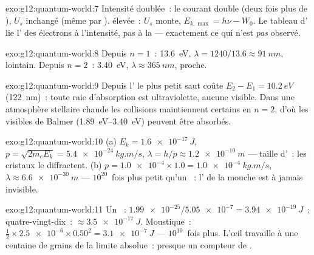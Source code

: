 \begin{solution}{exo:g12:quantum-world:7}
Intensité doublée~: le courant double (deux fois plus de
), $U_s$ inchangé (même
 par ).
 élevée~: $U_s$ monte,
$E_{k,\max} = h\nu - W_0$. Le tableau d' lie
l' des électrons à l'intensité, pas à la
 --- exactement ce qui n'est
\emph{pas} observé.
\end{solution}

\begin{solution}{exo:g12:quantum-world:8}
Depuis $n = 1$~: \qty{13.6}{eV}, $\lambda = 1240/13.6 \approx
\qty{91}{nm}$,  lointain. Depuis
$n = 2$~: \qty{3.40}{eV}, $\lambda \approx \qty{365}{nm}$,
 proche.
\end{solution}

\begin{solution}{exo:g12:quantum-world:9}
Depuis l' le plus petit saut coûte
$E_2 - E_1 = \qty{10.2}{eV}$ (\qty{122}{nm})~: toute raie d'absorption
est ultraviolette, aucune visible. Dans une
atmosphère stellaire chaude les collisions maintiennent certains
 en $n = 2$, d'où les
 visibles de Balmer (\qtyrange{1.89}{3.40}{eV})
peuvent être absorbés.
\end{solution}

\begin{solution}{exo:g12:quantum-world:10}
(a) $E_k = \qty{1.6e-17}{J}$, $p = \sqrt{2m_e E_k} =
\qty{5.4e-24}{kg.m/s}$, $\lambda = h/p \approx \qty{1.2e-10}{m}$ ---
taille d'~: les cristaux le diffractent. (b) $p = \num{1.0e-4}
\times 1.0 = \qty{1.0e-4}{kg.m/s}$, $\lambda \approx \qty{6.6e-30}{m}$
--- $10^{20}$~fois plus petit qu'un
~: l' de
la mouche est à jamais invisible.
\end{solution}

\begin{solution}{exo:g12:quantum-world:11}
Un ~: $\num{1.99e-25}/\num{5.05e-7} =
\qty{3.94e-19}{J}$~; quatre-vingt-dix~: $\approx \qty{3.5e-17}{J}$.
Moustique~: $\tfrac12 \times \num{2.5e-6} \times 0.50^2 =
\qty{3.1e-7}{J}$ --- $10^{10}$~fois plus. L'œil travaille à une
centaine de grains de la limite absolue~: presque un compteur de
.
\end{solution}

